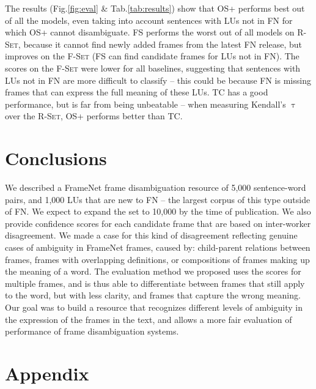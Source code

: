 The results (Fig.\ref{fig:eval} \& Tab.\ref{tab:results}) show that OS+ performs best out of all the models, even taking into account sentences with LUs not in FN for which OS+ cannot disambiguate. FS performs the worst out of all models on \textsc{R-Set}, because it cannot find newly added frames from the latest FN release, but improves on the \textsc{F-Set} (FS can find candidate frames for LUs not in FN). The scores on the \textsc{F-Set} were lower for all baselines, suggesting that sentences with LUs not in FN are more difficult to classify -- this could be because FN is missing frames that can express the full meaning of these LUs. TC has a good performance, but is far from being unbeatable -- when measuring Kendall's $\uptau$ over the \textsc{R-Set}, OS+ performs better than TC.


\section{Conclusions}

We described a FrameNet frame disambiguation resource of 5,000 sentence-word pairs, and 1,000 LUs that are new to FN -- the largest corpus of this type outside of FN.  We expect to expand the set to 10,000 by the time of publication.  We also provide confidence scores for each candidate frame that are based on inter-worker disagreement. We made a case for this kind of disagreement reflecting genuine cases of ambiguity in FrameNet frames, caused by: child-parent relations between frames, frames with overlapping definitions, or compositions of frames making up the meaning of a word. The evaluation method we proposed uses the scores for multiple frames, and is thus able to differentiate between frames that still apply to the word, but with less clarity, and frames that capture the wrong meaning. Our goal was to build a resource that recognizes different levels of ambiguity in the expression of the frames in the text, and allows a more fair evaluation of performance of frame disambiguation systems.

\section*{Appendix}

